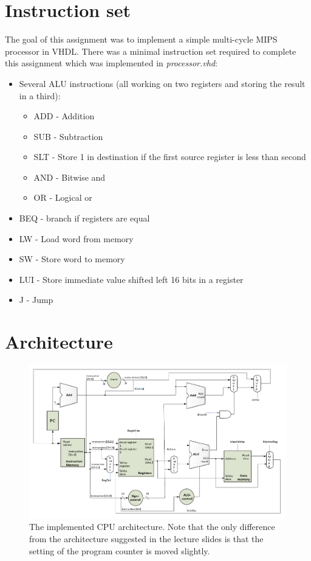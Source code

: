 \section{Instruction set}
The goal of this assignment was to implement a simple multi-cycle MIPS processor in VHDL.
There was a minimal instruction set required to complete this assignment which was implemented in \emph{processor.vhd}:
\begin{itemize}
    \item Several ALU instructions (all working on two registers and storing the result in a third):
        \begin{itemize}
            \item ADD - Addition
            \item SUB - Subtraction
            \item SLT - Store 1 in destination if the first source register is less than second
            \item AND - Bitwise and
            \item OR  - Logical or
        \end{itemize}
    \item BEQ - branch if registers are equal
    \item LW - Load word from memory
    \item SW - Store word to memory
    \item LUI - Store immediate value shifted left 16 bits in a register
    \item J - Jump
\end{itemize}

\section{Architecture}
\begin{figure}[ht]
    \centering
    \includegraphics[scale=0.3]{figures/cpu.png}
    \caption{\label{fig:cpuArchitecture}The implemented CPU architecture. Note that the only difference from the architecture suggested in the lecture slides is that the setting of the program counter is moved slightly.} %
\end{figure}

